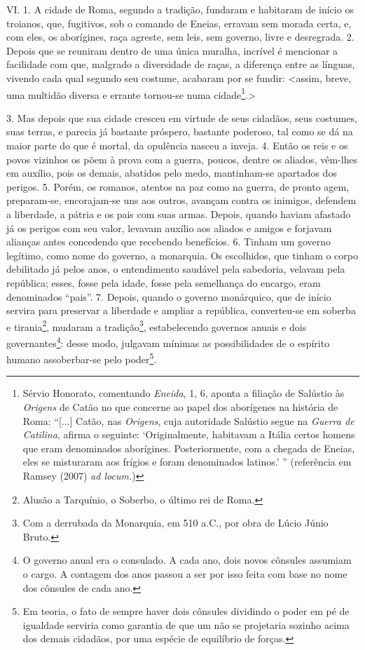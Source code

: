 VI. 1. A cidade de Roma, segundo a tradição, fundaram e habitaram de início os
troianos, que, fugitivos, sob o comando de Eneias, erravam sem morada certa, e,
com eles, os aborígines, raça agreste, sem leis, sem governo, livre e
desregrada. 2. Depois que se reuniram dentro de uma única muralha, incrível é
mencionar a facilidade com que, malgrado a diversidade de raças, a diferença
entre as línguas, vivendo cada qual segundo seu costume, acabaram por se
fundir: \textless assim, breve, uma multidão diversa e errante tornou-se numa
cidade\footnote{Sérvio Honorato, comentando \emph{Eneida}, 1, 6, aponta a
filiação de Salústio às \emph{Origens} de Catão no que concerne ao papel dos
aborígenes na história de Roma: ``[...] Catão, nas \emph{Origens}, cuja
autoridade Salústio segue na \emph{Guerra de Catilina}, afirma o seguinte:
`Originalmente, habitavam a Itália certos homens que eram denominados
aborígines. Posteriormente, com a chegada de Eneias, eles se misturaram aos
frígios e foram denominados latinos.' '' (referência em Ramsey (2007) \emph{ad
locum.})}.\textgreater

3. Mas depois que sua cidade cresceu em virtude de seus cidadãos, seus
costumes, suas terras, e parecia já bastante próspero, bastante poderoso, tal
como se dá na maior parte do que é mortal, da opulência nasceu a inveja. 4.
Então os reis e os povos vizinhos os põem à prova com a guerra, poucos, dentre
os aliados, vêm-lhes em auxílio, pois os demais, abatidos pelo medo,
mantinham-se apartados dos perigos. 5. Porém, os romanos, atentos na paz como
na guerra, de pronto agem, preparam-se, encorajam-se uns aos outros, avançam
contra os inimigos, defendem a liberdade, a pátria e os pais com suas armas.
Depois, quando haviam afastado já os perigos com seu valor, levavam auxílio aos
aliados e amigos e forjavam alianças antes concedendo que recebendo benefícios.
6. Tinham um governo legítimo, como nome do governo, a monarquia. Os
escolhidos, que tinham o corpo debilitado já pelos anos, o entendimento
saudável pela sabedoria, velavam pela república; esses, fosse pela idade, fosse
pela semelhança do encargo, eram denominados “pais”. 7. Depois, quando o
governo monárquico, que de início servira para preservar a liberdade e ampliar
a república, converteu-se em soberba e tirania\footnote{Alusão a Tarquínio, o
Soberbo, o último rei de Roma.}, mudaram a tradição\footnote{Com a derrubada da
Monarquia, em 510 a.C., por obra de Lúcio Júnio  Bruto.}, estabelecendo
governos anuais e dois governantes\footnote{O governo anual era o consulado. A
cada ano, dois novos cônsules assumiam o cargo. A contagem dos anos passou a
ser por isso feita com base no nome dos cônsules de cada ano.}: desse modo,
julgavam mínimas as possibilidades de o espírito humano assoberbar-se pelo
poder\footnote{Em teoria, o fato de sempre haver dois cônsules dividindo  o
poder em pé de igualdade serviria como garantia de que um não se projetaria
sozinho acima dos demais cidadãos, por uma espécie de equilíbrio de forças.}.

